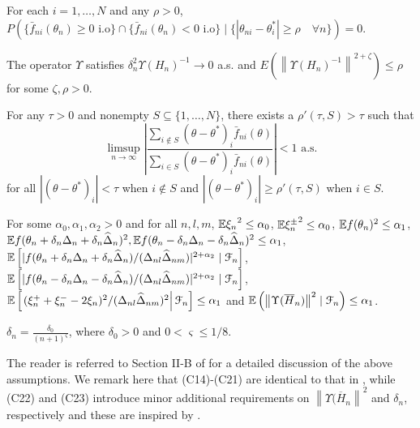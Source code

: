 \begin{pvn}
\item For each $i=1,\ldots,N$ and any $\rho>0$, 
$P(\{ \bar f_{ni} (\theta_n) \ge 0 \text{ i.o}\} \cap \{ \bar f_{ni} (\theta_n) < 0 \text{ i.o}\} \mid \{ |\theta_{ni} - \theta^*_i| \ge \rho\quad \forall n\}) =0.$

\item The operator $\Upsilon$ satisfies $\delta_n^2 \Upsilon(H_n)^{-1} \rightarrow 0$ a.s. and  $E(\left\| \Upsilon(H_n)^{-1}\right\|^{2+\zeta}) \le \rho$ for some $\zeta, \rho>0$.

\item For any $\tau >0$ and nonempty $S \subseteq \{1,\ldots,N\}$, there exists a $\rho'(\tau,S)>\tau$ such that 
$$ \limsup_{n\rightarrow \infty} \left| \dfrac{\sum_{i \notin S} (\theta-\theta^*)_i \bar f_{ni}(\theta)}{\sum_{i \in S} (\theta-\theta^*)_i \bar f_{ni}(\theta)}               \right| < 1 \text{ a.s.}$$
for all $|(\theta-\theta^*)_i| < \tau$ when $i \notin S$ and $|(\theta-\theta^*)_i| \ge \rho'(\tau,S)$ when $i\in S$.
\item For some $\alpha_0, \alpha_1, \alpha_2 >0$ and for all $n,l,m$, $\mathbb{E} {\xi_n}^{2} \le \alpha_0$, $\mathbb{E} {\xi_n^{\pm}}^{2} \le \alpha_0$, $\mathbb{E} f(\theta_n)^{2} \le \alpha_1$,  $\mathbb{E} f(\theta_n + \delta_n \Delta_n + \delta_n \widehat \Delta_n)^{2},\mathbb{E} f(\theta_n - \delta_n \Delta_n - \delta_n \widehat \Delta_n)^{2} \le \alpha_1$, 
$\mathbb{E} \left[| f(\theta_n + \delta_n \Delta_n + \delta_n \widehat \Delta_n)/ (\Delta_{nl}\widehat\Delta_{nm})|^{2+\alpha_2} \mid \mathcal{F}_n\right]$,
$\mathbb{E} \left[ |f(\theta_n - \delta_n \Delta_n - \delta_n \widehat \Delta_n)/ (\Delta_{nl}\widehat\Delta_{nm})|^{2+\alpha_2} \mid \mathcal{F}_n\right]$,
 $\mathbb{E}\left[\left. (\xi_n^+ + \xi_n^- - 2 \xi_n)^2/(\Delta_{nl}\widehat\Delta_{nm})^2 \right| \mathcal{F}_n \right] \le \alpha_1$ 
and $\mathbb{E} \left(\left\| \Upsilon(\overline H_n) \right\|^2 \mid \mathcal{F}_n\right) \le \alpha_1$. 
\item  $\delta_n = \frac{\delta_0}{(n+1)^{\varsigma}}$, where $\delta_0 > 0$ and $0 < \varsigma \le 1/8$.
\end{pvn}
The reader is referred to Section II-B of \cite{prashanth2015rdsa} for a detailed discussion of the above assumptions. We remark here that (C14)-(C21) are identical to that in \cite{prashanth2015rdsa}, while (C22) and (C23) introduce minor additional requirements on $\left\| \Upsilon(\overline H_n \right\|^2$ and $\delta_n$, respectively and these are inspired by \cite{spall-jacobian}.

